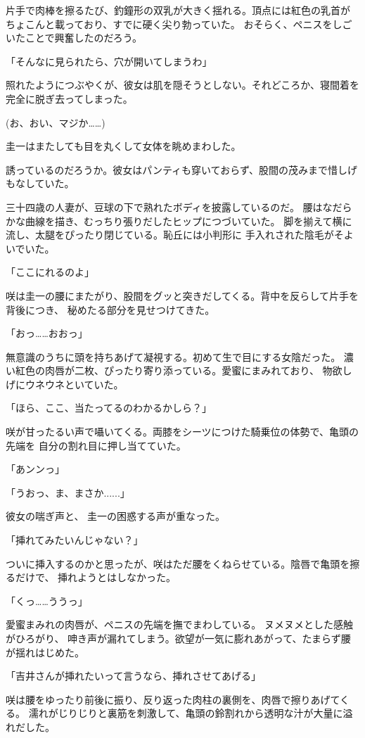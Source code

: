 ﻿\documentclass[
    book,tate,
    line_length=30zw,
    jafontsize=12pt,
    paper=b5j,
    landscape,
    ]{jlreq}
\begin{document}
片手で肉棒を擦るたび、釣鐘形の双乳が大きく揺れる。頂点には紅色の乳首が
ちょこんと載っており、すでに硬く尖り勃っていた。
おそらく、ペニスをしごいたことで興奮したのだろう。

「そんなに見られたら、穴が開いてしまうわ」

照れたようにつぶやくが、彼女は肌を隠そうとしない。それどころか、寝間着を完全に脱ぎ去ってしまった。

(お、おい、マジか……)

圭一はまたしても目を丸くして女体を眺めまわした。

誘っているのだろうか。彼女はパンティも穿いておらず、股間の茂みまで惜しげもなしていた。

三十四歳の人妻が、豆球の下で熟れたボディを披露しているのだ。
腰はなだらかな曲線を描き、むっちり張りだしたヒップにつづいていた。
脚を揃えて横に流し、太腿をぴったり閉じている。恥丘には小判形に
手入れされた陰毛がそよいでいた。

「ここにれるのよ」

咲は圭一の腰にまたがり、股間をグッと突きだしてくる。背中を反らして片手を背後につき、
秘めたる部分を見せつけてきた。

「おっ……おおっ」

無意識のうちに頭を持ちあげて凝視する。初めて生で目にする女陰だった。
濃い紅色の肉唇が二枚、ぴったり寄り添っている。愛蜜にまみれており、
物欲しげにウネウネといていた。

「ほら、ここ、当たってるのわかるかしら？」

咲が甘ったるい声で囁いてくる。両膝をシーツにつけた騎乗位の体勢で、亀頭の先端を
自分の割れ目に押し当てていた。

「あンンっ」

「うおっ、ま、まさか......」

彼女の喘ぎ声と、 圭一の困惑する声が重なった。

「挿れてみたいんじゃない？」

ついに挿入するのかと思ったが、咲はただ腰をくねらせている。陰唇で亀頭を擦るだけで、
挿れようとはしなかった。

「くっ……ううっ」

愛蜜まみれの肉唇が、ペニスの先端を撫でまわしている。 ヌメヌメとした感触がひろがり、
呻き声が漏れてしまう。欲望が一気に膨れあがって、たまらず腰が揺れはじめた。

「吉井さんが挿れたいって言うなら、挿れさせてあげる」

咲は腰をゆったり前後に振り、反り返った肉柱の裏側を、肉唇で擦りあげてくる。
濡れがじりじりと裏筋を刺激して、亀頭の鈴割れから透明な汁が大量に溢れだした。
\end{document}
